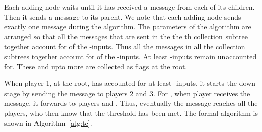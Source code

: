 \documentclass[10pt]{llncs}
\newcommand{\countm}{\xspace}
\newcommand{\done}{\xspace}
\newcommand{\oneinputs}{-inputs\xspace}
\begin{document}
Each adding node waits until it has received a \countm 
message from each of its children. Then it sends a \countm message 
to its parent. We note that
each adding node sends exactly one message during the algorithm. 
The parameters of the algorithm are arranged so that all the \countm 
messages that are sent in the the th collection subtree together account 
for  of the \oneinputs. Thus all the \countm messages in all the 
collection subtrees together account for  
of the \oneinputs. At least  \oneinputs 
remain unaccounted for. These and upto  more are collected 
as flags at the root.

When player 1, at the root,  has accounted for at least  
\oneinputs, it starts the down stage by sending the \done message 
to players 2 and 3. For , when player  receives the \done message, 
it forwards to players  and . Thus, eventually the  \done
message reaches all the players, who then know that the threshold 
has been met. The formal algorithm is shown in Algorithm~\ref{alg:tc}.
\end{document}
